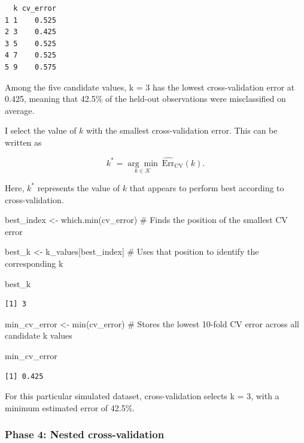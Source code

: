 \documentclass[
  letterpaper,
  DIV=11,
  numbers=noendperiod]{scrreprt}
\newenvironment{Shaded}{\begin{snugshade}}{\end{snugshade}}
\newcommand{\CommentTok}[1]{\textcolor[rgb]{0.37,0.37,0.37}{#1}}
\newcommand{\FunctionTok}[1]{\textcolor[rgb]{0.28,0.35,0.67}{#1}}
\newcommand{\NormalTok}[1]{\textcolor[rgb]{0.00,0.23,0.31}{#1}}
\newcommand{\OtherTok}[1]{\textcolor[rgb]{0.00,0.23,0.31}{#1}}
\begin{document}
\begin{verbatim}
  k cv_error
1 1    0.525
2 3    0.425
3 5    0.525
4 7    0.525
5 9    0.575
\end{verbatim}

Among the five candidate values, k = 3 has the lowest cross-validation
error at 0.425, meaning that 42.5\% of the held-out observations were
misclassified on average.

I select the value of \(k\) with the smallest cross-validation error.
This can be written as

\[
k^*
=
\underset{k \in \mathcal{K}}{\arg\min}
\ \widehat{\mathrm{Err}}_{\mathrm{CV}}(k).
\]

Here, \(k^*\) represents the value of \(k\) that appears to perform best
according to cross-validation.

\begin{Shaded}
\begin{Highlighting}[]
\NormalTok{best\_index }\OtherTok{\textless{}{-}} \FunctionTok{which.min}\NormalTok{(cv\_error) }\CommentTok{\# Finds the position of the smallest CV error}

\NormalTok{best\_k }\OtherTok{\textless{}{-}}\NormalTok{ k\_values[best\_index] }\CommentTok{\# Uses that position to identify the corresponding k}

\NormalTok{best\_k}
\end{Highlighting}
\end{Shaded}

\begin{verbatim}
[1] 3
\end{verbatim}

\begin{Shaded}
\begin{Highlighting}[]
\NormalTok{min\_cv\_error }\OtherTok{\textless{}{-}} \FunctionTok{min}\NormalTok{(cv\_error) }\CommentTok{\# Stores the lowest 10{-}fold CV error across all candidate k values}

\NormalTok{min\_cv\_error}
\end{Highlighting}
\end{Shaded}

\begin{verbatim}
[1] 0.425
\end{verbatim}

For this particular simulated dataset, cross-validation selects k = 3,
with a minimum estimated error of 42.5\%.

\subsubsection{Phase 4: Nested
cross-validation}\label{phase-4-nested-cross-validation}
\end{document}
